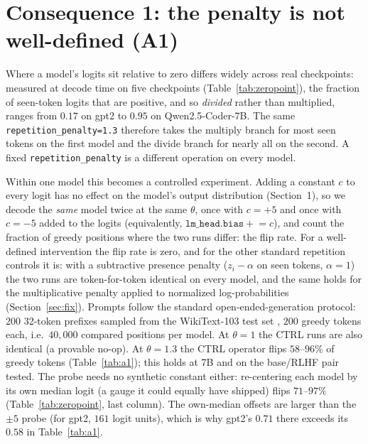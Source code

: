 \documentclass[11pt]{article}
\newcommand{\thp}{\theta}
\newcommand{\code}[1]{\texttt{#1}}
\begin{document}
\section{Consequence 1: the penalty is not well-defined (A1)}

Where a model's logits sit relative to zero differs widely across real checkpoints:
measured at decode time on five checkpoints (Table~\ref{tab:zeropoint}), the fraction of
seen-token logits that are positive, and so \emph{divided} rather than multiplied, ranges from
$0.17$ on gpt2 to $0.95$ on Qwen2.5-Coder-7B. The same \code{repetition\_penalty=1.3} therefore
takes the multiply branch for most seen tokens on the first model and the divide branch for
nearly all on the second. A fixed \code{repetition\_penalty} is a different operation on every
model.

Within one model this becomes a controlled experiment. Adding a constant $c$ to every logit has no
effect on the model's output distribution (Section~1), so we decode the \emph{same} model twice at
the same $\thp$, once with $c=+5$ and once with $c=-5$ added to the logits (equivalently,
$\code{lm\_head.bias}\mathrel{+}=c$), and count the fraction of greedy positions where the two
runs differ: the flip rate. For a well-defined intervention the flip rate is zero, and for the
other standard repetition controls it is: with a subtractive presence penalty ($z_i - \alpha$ on
seen tokens, $\alpha=1$) the two runs are token-for-token identical on every model, and the same
holds for the multiplicative penalty applied to normalized log-probabilities (Section~\ref{sec:fix}).
Prompts follow the standard open-ended-generation protocol: $200$ 32-token prefixes sampled from
the WikiText-103 test set \citep{merity2017pointer,su2022contrastive}, $200$ greedy tokens each,
i.e.\ $40{,}000$ compared positions per model. At $\thp=1$ the CTRL runs are also identical (a
provable no-op). At $\thp=1.3$ the CTRL operator flips $58$--$96\%$ of greedy tokens
(Table~\ref{tab:a1}); this holds at 7B and on the base/RLHF pair tested. The probe needs no synthetic
constant either: re-centering each model by its own median logit (a gauge it could equally have
shipped) flips $71$--$97\%$ (Table~\ref{tab:zeropoint}, last column). The own-median offsets are
larger than the $\pm5$ probe (for gpt2, $161$ logit units), which is why gpt2's $0.71$ there
exceeds its $0.58$ in Table~\ref{tab:a1}.
\end{document}
